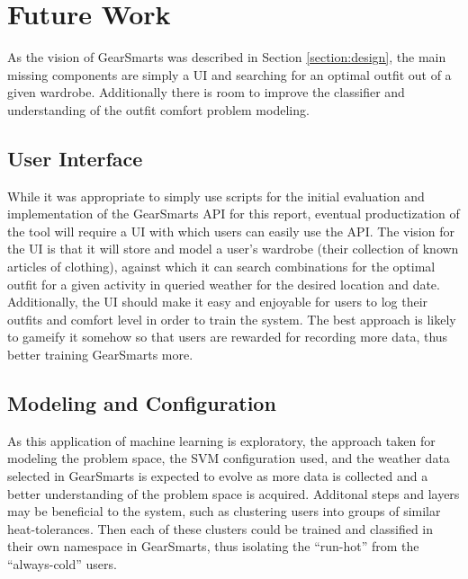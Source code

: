 \section{Future Work}
\label{section:futurework}
As the vision of GearSmarts was described in Section \ref{section:design}, the main missing components are simply a UI
and searching for an optimal outfit out of a given wardrobe. Additionally there is room to improve the classifier and
understanding of the outfit comfort problem modeling.

\subsection{User Interface}
\label{section:ui}
While it was appropriate to simply use scripts for the initial evaluation and implementation of the GearSmarts API for
this report, eventual productization of the tool will require a UI with which users can easily use the API. The vision
for the UI is that it will store and model a user's wardrobe (their collection of known articles of clothing), against
which it can search combinations for the optimal outfit for a given activity in queried weather for the desired location
and date. Additionally, the UI should make it easy and enjoyable for users to log their outfits and comfort level in order
to train the system. The best approach is likely to gameify it somehow so that users are rewarded for recording more
data, thus better training GearSmarts more.

\subsection{Modeling and Configuration}
\label{section:modelingandconfig}
As this application of machine learning is exploratory, the approach taken for modeling the problem space, the
SVM configuration used, and the weather data selected in GearSmarts is expected to evolve as more data is collected and
a better understanding of the problem space is acquired. Additonal steps and layers may be beneficial to the system, such
as clustering users into groups of similar heat-tolerances. Then each of these clusters could be trained and classified in
their own namespace in GearSmarts, thus isolating the ``run-hot'' from the ``always-cold'' users.